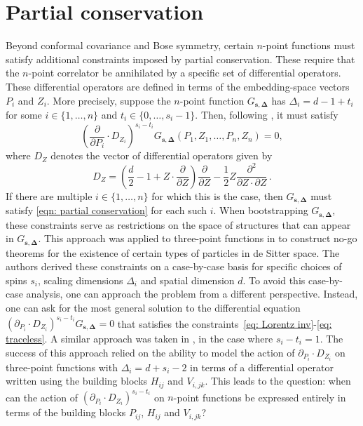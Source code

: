 \documentclass[12pt,a4paper]{extarticle}
\theoremstyle{definition}
\begin{document}
\section{Partial conservation}\label{sec: conservation}
\noindent Beyond conformal covariance and Bose symmetry, certain $n$-point functions must satisfy additional constraints imposed by partial conservation.
These require that the $n$-point correlator be annihilated by a specific set of differential operators. 
These differential operators are defined in terms of the embedding-space vectors $P_i$ and $Z_i$. 
More precisely, suppose the $n$-point function $G_{\mathbf{s},\mathbf{\Delta}}$ has $\Delta_i=d-1+t_i$ for some $i\in\{1,\ldots,n\}$ and $t_i \in \{0, \dots, s_i-1\}$. 
Then, following \cite{DNW}, it must satisfy 
\begin{equation}\label{eqn: partial conservation}
    \left(\frac{\partial}{\partial P_i}\cdot D_{Z_i}\right)^{s_i-t_i}
    G_{\mathbf{s},\mathbf{\Delta}}(P_1,Z_1,\ldots,P_n,Z_n)=0,
\end{equation}
where $D_{Z}$ denotes the vector of differential operators given by
\begin{equation}\label{eqn:ThomasTodorov}
    D_{Z}
    =
    \left(\frac{d}{2}-1+Z\cdot\frac{\partial}{\partial Z}\right)\frac{\partial}{\partial Z}
    -\frac{1}{2}Z\frac{\partial^2}{\partial Z\cdot\partial Z}\,.
\end{equation}
If there are multiple $i\in\{1,\ldots,n\}$ for which this is the case, then $G_{\mathbf{s},\mathbf{\Delta}}$ must satisfy \eqref{eqn: partial conservation} for each such $i$. When bootstrapping $G_{\mathbf{s},\mathbf{\Delta}}$, these constraints serve as restrictions on the space of structures that can appear in $G_{\mathbf{s},\mathbf{\Delta}}$. This approach was applied to three-point functions in \cite{DanielNathan} to construct no-go theorems for the existence of certain types of particles in de Sitter space. The authors derived these constraints on a case-by-case basis for specific choices of spins $s_i$, scaling dimensions $\Delta_i$ and spatial dimension $d$. 
To avoid this case-by-case analysis, one can approach the problem from a different perspective. Instead, one can ask for the most general solution to the differential equation
$(\partial_{P_i}\cdot D_{Z_i})^{s_i - t_i}G_{\mathbf{s}, \mathbf{\Delta}} = 0$ that satisfies the constraints~\eqref{eq: Lorentz inv}-\eqref{eq: traceless}.
A similar approach was taken in \cite{Zhiboedov}, in the case where $s_i-t_i=1$.
The success of this approach relied on the ability to model the action of $\partial_{P_i}\cdot D_{Z_i}$ on three-point functions with $\Delta_i=d+s_i-2$ in terms of a differential operator written using the building blocks $H_{ij}$ and $V_{i,jk}$. This leads to the question: when can the action of $(\partial_{P_i}\cdot D_{Z_i})^{s_i - t_i}$ on $n$-point functions be expressed entirely in terms of the building blocks $P_{ij}$, $H_{ij}$ and $V_{i,jk}$?
\end{document}
